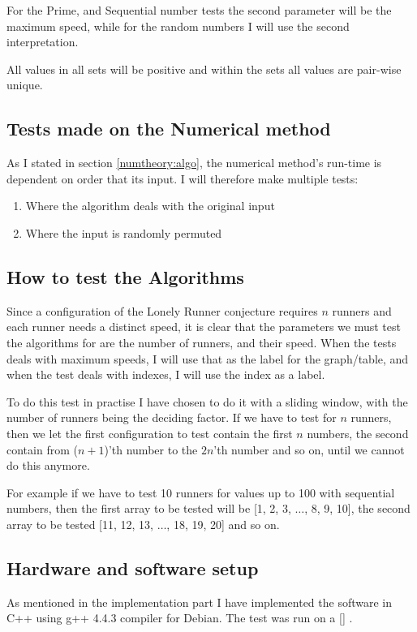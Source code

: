 For the Prime, and Sequential number tests the second parameter will be the maximum speed, while for the random numbers I will use the second interpretation.

All values in all sets will be positive and within the sets all values are pair-wise unique.

\subsection{Tests made on the Numerical method}
As I stated in section \ref{numtheory:algo}, the numerical
method's run-time is dependent on order that its input. I will
therefore make multiple tests:
\begin{enumerate}
\item Where the algorithm deals with the original input
\item Where the input is randomly permuted
\end{enumerate} 

\subsection{How to test the Algorithms}
Since a configuration of the Lonely Runner conjecture requires $n$ runners and each runner needs a distinct speed, it is clear that the parameters we must test the algorithms for are the number of runners, and their speed. When the tests deals with maximum speeds, I will use that as the label for the graph/table, and when the test deals with indexes, I will use the index as a label.

To do this test in practise I have chosen to do it with a sliding window, with the number of runners being the deciding factor. If we have to test for $n$ runners, then we let the first configuration to test contain the first $n$ numbers, the second contain from ($n+1$)'th number to the $2n$'th number and so on, until we cannot do this anymore.

For example if we have to test 10 runners for values up to 100 with sequential numbers, then the first array to be tested will be [1, 2, 3, $\ldots$, 8, 9, 10], the second array to be tested [11, 12, 13, $\ldots$, 18, 19, 20] and so on.



\subsection{Hardware and software setup}
As mentioned in the implementation part I have implemented the software in C++ using g++ 4.4.3 compiler for Debian. The test was run on a [] .

